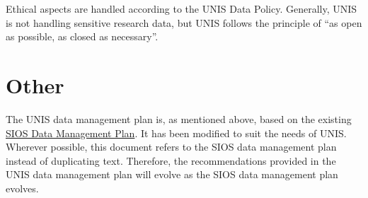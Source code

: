 \documentclass[a4paper,english, 11pt]{article}
\begin{document}
Ethical aspects are handled according to the UNIS Data Policy. Generally, UNIS is not handling sensitive research data, but UNIS follows the principle of ``as open as possible, as closed as necessary''.

\section{Other}
\label{s:other}

The UNIS data management plan is, as mentioned above, based on the existing \href{https://sios-svalbard.org/sites/sios-svalbard.org/files/common/SIOS_Data_Management_Plan.pdf}{SIOS Data Management Plan}. It has been modified to suit the needs of UNIS. Wherever possible, this document refers to the SIOS data management plan instead of duplicating text. Therefore, the recommendations provided in the UNIS data management plan will evolve as the SIOS data management plan evolves. 
\end{document}
